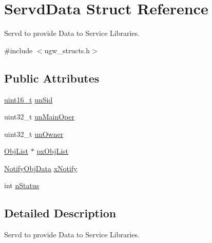 \hypertarget{structServdData}{\section{Servd\-Data Struct Reference}
\label{structServdData}
}


Servd to provide Data to Service Libraries.  




{\ttfamily \#include $<$ugw\-\_\-structs.\-h$>$}

\subsection*{Public Attributes}
\begin{DoxyCompactItemize}
\item 
\hyperlink{commondefs_8h_adf4d876453337156dde61095e1f20223}{uint16\-\_\-t} \hyperlink{structServdData_af9ec758f5ce6532d5da3ad544c27b335}{un\-Sid}
\item 
uint32\-\_\-t \hyperlink{structServdData_aee9c93a802703e621f33bd4e065716bb}{un\-Main\-Oper}
\item 
uint32\-\_\-t \hyperlink{structServdData_adc9da01914ccc12e73810e813a5a48e2}{un\-Owner}
\item 
\hyperlink{structObjList}{Obj\-List} $\ast$ \hyperlink{structServdData_ac66a4b645c210b527cd3f940a5b81397}{px\-Obj\-List}
\item 
\hyperlink{structNotifyObjData}{Notify\-Obj\-Data} \hyperlink{structServdData_a6532e82f2c4113c509596c7908942ccd}{x\-Notify}
\item 
int \hyperlink{structServdData_a0de42c741a9493a88dc7e12b80607c83}{n\-Status}
\end{DoxyCompactItemize}


\subsection{Detailed Description}
Servd to provide Data to Service Libraries. 

